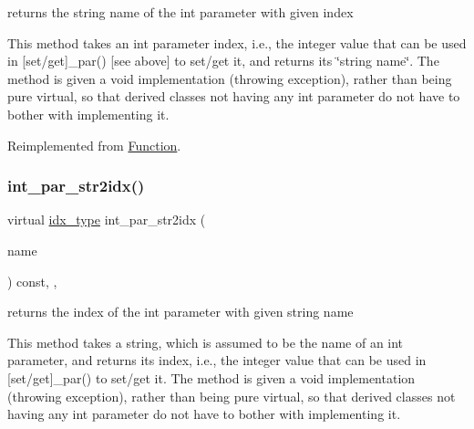 returns the string name of the int parameter with given index 

This method takes an int parameter index, i.\+e., the integer value that can be used in \mbox{[}set/get\mbox{]}\+\_\+par() \mbox{[}see above\mbox{]} to set/get it, and returns its \char`\"{}string name\char`\"{}. The method is given a void implementation (throwing exception), rather than being pure virtual, so that derived classes not having any int parameter do not have to bother with implementing it. 

Reimplemented from \mbox{\hyperlink{class_s_m_spp__di__unipi__it_1_1_function_a61e973f39747f63b8f56d97cc62e32ce}{Function}}.

\mbox{\label{class_s_m_spp__di__unipi__it_1_1_c05_function_ae281b6699b0707a5cdc1e82b76d26c09}} 
\subsubsection{\texorpdfstring{int\+\_\+par\+\_\+str2idx()}{int\_par\_str2idx()}}
{\footnotesize\ttfamily virtual \mbox{\hyperlink{class_s_m_spp__di__unipi__it_1_1_thin_compute_interface_aa3d710629ad8c434286726ad810c3b47}{idx\+\_\+type}} int\+\_\+par\+\_\+str2idx (\begin{DoxyParamCaption}\item[{const std\+::string \&}]{name }\end{DoxyParamCaption}) const\hspace{0.3cm}{\ttfamily [inline]}, {\ttfamily [override]}, {\ttfamily [virtual]}}



returns the index of the int parameter with given string name 

This method takes a string, which is assumed to be the name of an int parameter, and returns its index, i.\+e., the integer value that can be used in \mbox{[}set/get\mbox{]}\+\_\+par() to set/get it. The method is given a void implementation (throwing exception), rather than being pure virtual, so that derived classes not having any int parameter do not have to bother with implementing it. 

